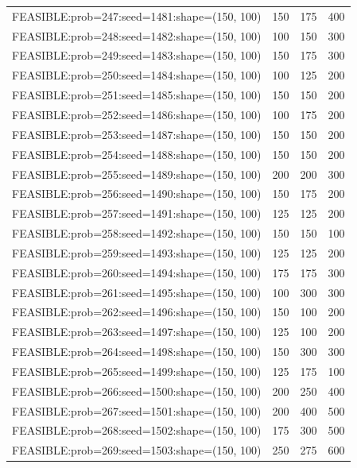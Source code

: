 \begin{longtable}{lccc}
FEASIBLE:prob=247:seed=1481:shape=(150, 100) &      150 &   175 &    400 \\
FEASIBLE:prob=248:seed=1482:shape=(150, 100) &      100 &   150 &    300 \\
FEASIBLE:prob=249:seed=1483:shape=(150, 100) &      150 &   175 &    300 \\
FEASIBLE:prob=250:seed=1484:shape=(150, 100) &      100 &   125 &    200 \\
FEASIBLE:prob=251:seed=1485:shape=(150, 100) &      150 &   150 &    200 \\
FEASIBLE:prob=252:seed=1486:shape=(150, 100) &      100 &   175 &    200 \\
FEASIBLE:prob=253:seed=1487:shape=(150, 100) &      150 &   150 &    200 \\
FEASIBLE:prob=254:seed=1488:shape=(150, 100) &      150 &   150 &    200 \\
FEASIBLE:prob=255:seed=1489:shape=(150, 100) &      200 &   200 &    300 \\
FEASIBLE:prob=256:seed=1490:shape=(150, 100) &      150 &   175 &    200 \\
FEASIBLE:prob=257:seed=1491:shape=(150, 100) &      125 &   125 &    200 \\
FEASIBLE:prob=258:seed=1492:shape=(150, 100) &      150 &   150 &    100 \\
FEASIBLE:prob=259:seed=1493:shape=(150, 100) &      125 &   125 &    200 \\
FEASIBLE:prob=260:seed=1494:shape=(150, 100) &      175 &   175 &    300 \\
FEASIBLE:prob=261:seed=1495:shape=(150, 100) &      100 &   300 &    300 \\
FEASIBLE:prob=262:seed=1496:shape=(150, 100) &      150 &   100 &    200 \\
FEASIBLE:prob=263:seed=1497:shape=(150, 100) &      125 &   100 &    200 \\
FEASIBLE:prob=264:seed=1498:shape=(150, 100) &      150 &   300 &    300 \\
FEASIBLE:prob=265:seed=1499:shape=(150, 100) &      125 &   175 &    100 \\
FEASIBLE:prob=266:seed=1500:shape=(150, 100) &      200 &   250 &    400 \\
FEASIBLE:prob=267:seed=1501:shape=(150, 100) &      200 &   400 &    500 \\
FEASIBLE:prob=268:seed=1502:shape=(150, 100) &      175 &   300 &    500 \\
FEASIBLE:prob=269:seed=1503:shape=(150, 100) &      250 &   275 &    600 \\

\end{longtable}
